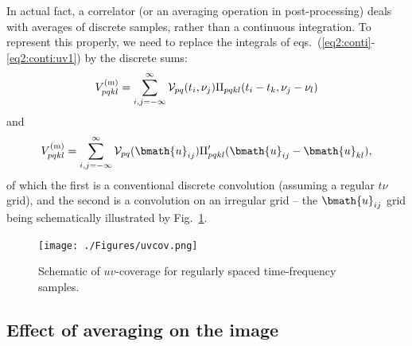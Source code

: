 \documentclass[useAMS,usenatbib]{mn2e}
\begin{document}
In actual fact, a correlator (or an averaging operation in post-processing) deals with averages of discrete 
samples, rather than a continuous integration. To represent this properly, we need to replace the integrals of 
eqs.~(\ref{eq2:conti}-\ref{eq2:conti:uv1}) by the discrete sums:
\begin{equation}
\label{eq:discrete:tf}
V^\mathrm{(m)}_{pqkl} = \sum_{i,j=-\infty}^{\infty}  \mathcal{V}_{pq}(t_i,\nu_j) \Pi_{pqkl}(t_i-t_k,\nu_j-\nu_l)
\end{equation}
and
\begin{equation}
\label{eq:discrete:uv}
V^\mathrm{(m)}_{pqkl} = \sum_{i,j=-\infty}^{\infty}  \VV_{pq}(\bmath{u}_{ij}) \Pi^\prime_{pqkl}(\bmath{u}_{ij}-\bmath{u}_{kl}),
\end{equation}
of which the first is a conventional discrete convolution (assuming a regular $t\nu$ grid), and the second is a convolution 
on an irregular grid -- the $\bmath{u}_{ij}$ grid being schematically illustrated by Fig.~\ref{fig:uvcov}.

\begin{figure}
\texttt{[image: ./Figures/uvcov.png]}\caption{Schematic of $uv$-coverage for 
regularly spaced time-frequency samples.}\label{fig:uvcov}
\end{figure}


\subsection{Effect of averaging on the image}
\label{sec:effectbw}
\end{document}
